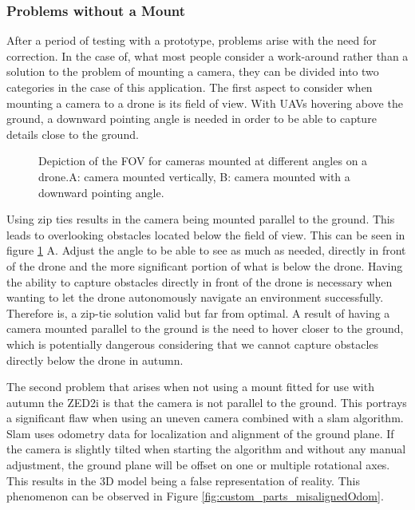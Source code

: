 \subsubsection{Problems without a Mount}

After a period of testing with a prototype, problems arise with the need for correction. In the case of, what most people consider a work-around rather than a solution to the problem of mounting a camera, they can be divided into two categories in the case of this application.
\newline The first aspect to consider when mounting a camera to a drone is its field of view. With UAVs hovering above the ground, a downward pointing angle is needed in order to be able to capture details close to the ground.  

\begin{figure}[h]
	\centering
	
	\caption{Depiction of the FOV for cameras mounted at different angles on a drone.\newline A: camera mounted vertically, B: camera mounted with a downward pointing angle.}
	\label{fig:custom_parts_FOV}
\end{figure}

Using zip ties results in the camera being mounted parallel to the ground. This leads to overlooking obstacles located below the field of view. This can be seen in figure \ref{fig:custom_parts_FOV} A. Adjust the angle to be able to see as much as needed, directly in front of the drone and the more significant portion of what is below the drone. Having the ability to capture obstacles directly in front of the drone is necessary when wanting to let the drone autonomously navigate an environment successfully. Therefore is, a zip-tie solution valid but far from optimal. A result of having a camera mounted parallel to the ground is the need to hover closer to the ground, which is potentially dangerous considering that we cannot capture obstacles directly below the drone in autumn.

The second problem that arises when not using a mount fitted for use with autumn the ZED2i is that the camera is not parallel to the ground. This portrays a significant flaw when using an uneven camera combined with a slam algorithm. Slam uses odometry data for localization and alignment of the ground plane. If the camera is slightly tilted when starting the algorithm and without any manual adjustment, the ground plane will be offset on one or multiple rotational axes. This results in the 3D model being a false representation of reality. This phenomenon can be observed in Figure \ref{fig:custom_parts_misalignedOdom}.

